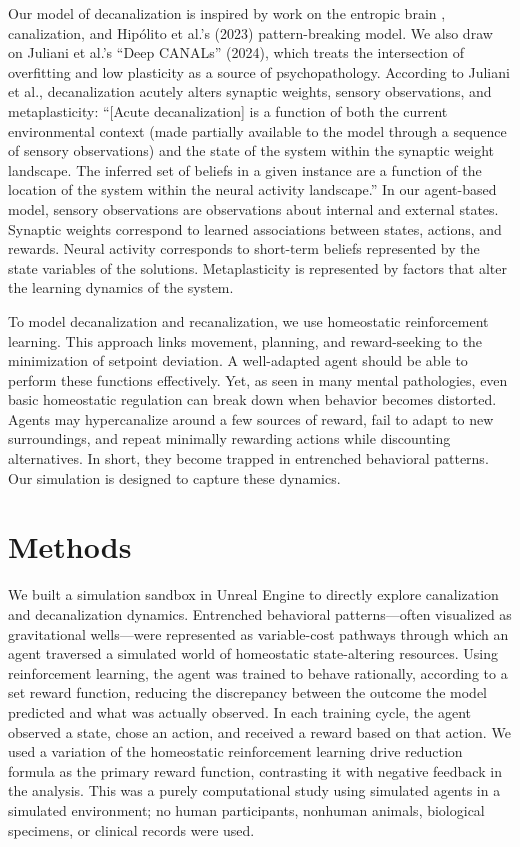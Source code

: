 Our model of decanalization is inspired by work on the entropic brain \cite{carhart-harris_entropic_2014,carhart-harris_entropic_2018}, canalization, and Hipólito et al.'s (2023) pattern-breaking model. We also draw on Juliani et al.'s “Deep CANALs” (2024), which treats the intersection of overfitting and low plasticity as a source of psychopathology. According to Juliani et al., decanalization acutely alters synaptic weights, sensory observations, and metaplasticity: “[Acute decanalization] is a function of both the current environmental context (made partially available to the model through a sequence of sensory observations) and the state of the system within the synaptic weight landscape. The inferred set of beliefs in a given instance are a function of the location of the system within the neural activity landscape.” In our agent-based model, sensory observations are observations about internal and external states. Synaptic weights correspond to learned associations between states, actions, and rewards. Neural activity corresponds to short-term beliefs represented by the state variables of the solutions. Metaplasticity is represented by factors that alter the learning dynamics of the system.

To model decanalization and recanalization, we use homeostatic reinforcement learning. This approach links movement, planning, and reward-seeking to the minimization of setpoint deviation. A well-adapted agent should be able to perform these functions effectively. Yet, as seen in many mental pathologies, even basic homeostatic regulation can break down when behavior becomes distorted. Agents may hypercanalize around a few sources of reward, fail to adapt to new surroundings, and repeat minimally rewarding actions while discounting alternatives. In short, they become trapped in entrenched behavioral patterns. Our simulation is designed to capture these dynamics.

\section{Methods}

We built a simulation sandbox in Unreal Engine to directly explore canalization and decanalization dynamics. Entrenched behavioral patterns—often visualized as gravitational wells—were represented as variable-cost pathways through which an agent traversed a simulated world of homeostatic state-altering resources. Using reinforcement learning, the agent was trained to behave rationally, according to a set reward function, reducing the discrepancy between the outcome the model predicted and what was actually observed. In each training cycle, the agent observed a state, chose an action, and received a reward based on that action. We used a variation of the homeostatic reinforcement learning drive reduction formula as the primary reward function, contrasting it with negative feedback in the analysis. This was a purely computational study using simulated agents in a simulated environment; no human participants, nonhuman animals, biological specimens, or clinical records were used.

